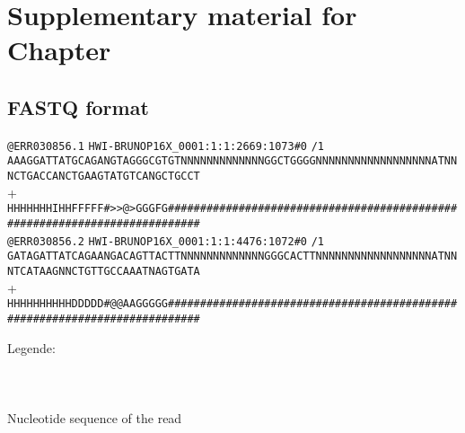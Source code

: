 \chapter[Supp. material for chap. \getrefnumber{ch:background}]{Supplementary material for Chapter }
\label{ch:SupplBack}

\section{FASTQ format}\label{sec:fastq-format}

{\color[rgb]{0.447059,0.678431,0.274510}\verb!@ERR030856.1!}
{\color[rgb]{0.500000,0.500000,0.500000}\verb!HWI-BRUNOP16X_0001:1:1:2669:1073#0!}%
{\color[rgb]{1.000000,0.000000,0.000000}\verb!/1!}\\
\verb!AAAGGATTATGCAGANGTAGGGCGTGTNNNNNNNNNNNNNGGCTGGGGNNNNNNNNNNNNNNNNNNATNNNCTGACCANCTGAAGTATGTCANGCTGCCT!\\
{\color[rgb]{0.698039,0.145098,0.450980}+}\\
{\color[rgb]{0.000000,0.000000,0.555711}\verb!HHHHHHHIHHFFFFF#>>@>GGGFG###########################################################################!}\\
{\color[rgb]{0.447059,0.678431,0.274510}\verb!@ERR030856.2!}
{\color[rgb]{0.500000,0.500000,0.500000}\verb!HWI-BRUNOP16X_0001:1:1:4476:1072#0!}%
{\color[rgb]{1.000000,0.000000,0.000000}\verb!/1!}\\
\verb!GATAGATTATCAGAANGACAGTTACTTNNNNNNNNNNNNNGGGCACTTNNNNNNNNNNNNNNNNNNATNNNTCATAAGNNCTGTTGCCAAATNAGTGATA!\\
{\color[rgb]{0.698039,0.145098,0.450980}+}\\
{\color[rgb]{0.000000,0.000000,0.555711}\verb!HHHHHHHHHHDDDDD#@@AAGGGGG###########################################################################!}

{\footnotesize
Legende:\\
\\
\\
\\
\quad\textbullet Nucleotide sequence of the read\\
\\
}


